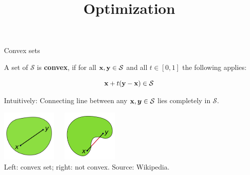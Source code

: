 



\usepackage[export]{adjustbox}


\newcommand{\titlefigure}{figure_man/convex.png}
\newcommand{\learninggoals}{
\item Convex sets
\item Convex functions
}



\title{Optimization}
\date{}



\sloppy




\begin{vbframe}{Convex sets}

A set of $\mathcal{S}$ is \textbf{convex}, if for all $\mathbf{x}, \mathbf{y} \in \mathcal{S}$ and all $t \in [0, 1]$ the following applies:

$$
\mathbf{x} + t (\mathbf{y} - \mathbf{x}) \in \mathcal{S}
$$

Intuitively: Connecting line between any $\mathbf{x}, \bm{y} \in \mathcal{S}$ lies completely in $\mathcal{S}$.

\begin{center}
\includegraphics[width = 0.2\textwidth]{figure_man/convex.png}~~~\includegraphics[width = 0.2\textwidth]{figure_man/concave.png} \\
\footnotesize{Left: convex set; right: not convex. Source: Wikipedia. 
}
\end{center}

\end{vbframe}

